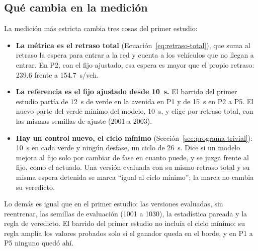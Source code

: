 \subsection*{Qué cambia en la medición}

La medición más estricta cambia tres cosas del primer estudio:
\begin{itemize}
  \item \textbf{La métrica es el retraso total}
    (Ecuación~\ref{eq:retraso-total}), que suma al retraso la espera
    para entrar a la red y cuenta a los vehículos que no llegan a
    entrar. En P2, con el fijo ajustado, esa espera es mayor que el
    propio retraso: 239.6 frente a 154.7~s/veh.
  \item \textbf{La referencia es el fijo ajustado desde 10~s.} El
    barrido del primer estudio partía de 12~s de verde en la avenida en
    P1 y de 15~s en P2 a P5. El nuevo parte del verde mínimo del modelo,
    10~s, y elige por retraso total, con las mismas semillas de ajuste
    (2001 a 2003).
  \item \textbf{Hay un control nuevo, el ciclo mínimo}
    (Sección~\ref{sec:programa-trivial}): 10~s en cada verde y ningún
    desfase, un ciclo de 26~s. Dice si un modelo mejora al fijo solo por
    cambiar de fase en cuanto puede, y se juzga frente al fijo, como el
    actuado. Una versión evaluada con su mismo retraso total y su misma
    espera detenida se marca ``igual al ciclo mínimo''; la marca no
    cambia su veredicto.
\end{itemize}

Lo demás es igual que en el primer estudio: las versiones evaluadas,
sin reentrenar, las semillas de evaluación (1001 a 1030), la
estadística pareada y la regla de veredicto. El barrido del primer
estudio no incluía el ciclo mínimo: su regla amplía los valores
probados solo si el ganador queda en el borde, y en P1 a P5 ninguno
quedó ahí.

